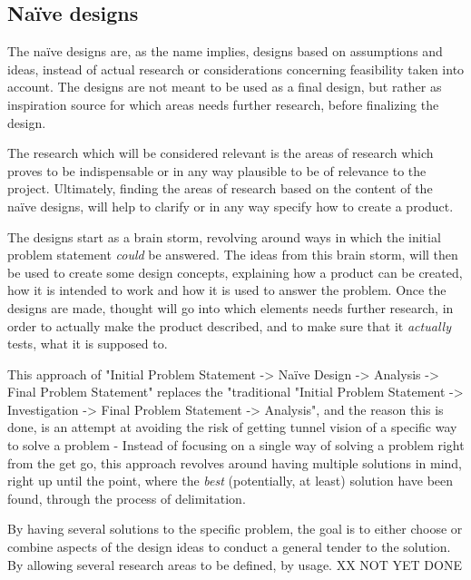 
\subsection{Naïve designs}
The naïve designs are, as the name implies, designs based on assumptions and ideas, instead of actual research or considerations concerning feasibility taken into account. The designs are not meant to be used as a final design, but rather as inspiration source for which areas needs further research, before finalizing the design.

The research which will be considered relevant is the areas of research which proves to be indispensable or in any way plausible to be of relevance to the project. Ultimately, finding the areas of research based on the content of the naïve designs, will help to clarify or in any way specify how to create a product.
\bigskip

The designs start as a brain storm, revolving around ways in which the initial problem statement \textit{could} be answered. The ideas from this brain storm, will then be used to create some design concepts, explaining how a product can be created, how it is intended to work and how it is used to answer the problem. Once the designs are made, thought will go into which elements needs further research, in order to actually make the product described, and to make sure that it \textit{actually} tests, what it is supposed to.
\bigskip

This approach of "Initial Problem Statement -> Naïve Design -> Analysis -> Final Problem Statement" replaces the "traditional "Initial Problem Statement -> Investigation -> Final Problem Statement -> Analysis", and the reason this is done, is an attempt at avoiding the risk of getting tunnel vision of a specific way to solve a problem - Instead of focusing on a single way of solving a problem right from the get go, this approach revolves around having multiple solutions in mind, right up until the point, where the \textit{best} (potentially, at least) solution have been found, through the process of delimitation. 

By having several solutions to the specific problem, the goal is to either choose or combine aspects of the design ideas to conduct a general tender to the solution. By allowing several research areas to be defined, by usage. XX NOT YET DONE
